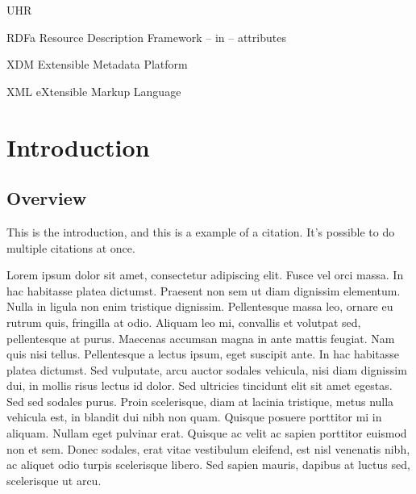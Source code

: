 \documentclass[botnum,fleqn,final]{unmeethesis}
\begin{document}
\tableofcontents
\listoffigures
\listoftables

\begin{glossary}{UHR}
   \item[RDFa] Resource Description Framework -- in -- attributes
   \item[XDM] Extensible Metadata Platform
   \item[XML] eXtensible Markup Language
\end{glossary}

\mainmatter

\chapter{\label{chapter:intro}Introduction}

\section{\label{section:intro:overview}Overview}

This is the introduction, and this is a example of a
citation.\cite{McCarron:09:H} It's possible to do multiple citations at
once.\cite{McCarron:09:H,Pemberton:08:RXS,Birbeck:08:RP,ccREL}


Lorem ipsum dolor sit amet, consectetur adipiscing elit. Fusce vel orci massa.
In hac habitasse platea dictumst. Praesent non sem ut diam dignissim elementum.
Nulla in ligula non enim tristique dignissim. Pellentesque massa leo, ornare eu
rutrum quis, fringilla at odio. Aliquam leo mi, convallis et volutpat sed,
pellentesque at purus. Maecenas accumsan magna in ante mattis feugiat. Nam quis
nisi tellus. Pellentesque a lectus ipsum, eget suscipit ante. In hac habitasse
platea dictumst. Sed vulputate, arcu auctor sodales vehicula, nisi diam
dignissim dui, in mollis risus lectus id dolor. Sed ultricies tincidunt elit
sit amet egestas. Sed sed sodales purus. Proin scelerisque, diam at lacinia
tristique, metus nulla vehicula est, in blandit dui nibh non quam. Quisque
posuere porttitor mi in aliquam. Nullam eget pulvinar erat. Quisque ac velit ac
sapien porttitor euismod non et sem. Donec sodales, erat vitae vestibulum
eleifend, est nisl venenatis nibh, ac aliquet odio turpis scelerisque libero.
Sed sapien mauris, dapibus at luctus sed, scelerisque ut arcu.
\end{document}

